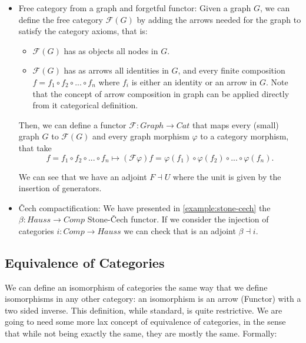 \begin{example}
  \begin{itemize}
  \item Free category from a graph and forgetful functor:  Given a graph $G$, we can define the free category $\mathcal{F}(G)$ by adding the arrows needed for the graph to satisfy the category axioms, that is:
    \begin{itemize}
    \item $\mathcal{F}(G)$ has as objects all nodes in $G$.
    \item $\mathcal{F}(G)$ has as arrows all identities in $G$, and every finite composition $f=f_1\circ f_2\circ ... \circ f_n$ where $f_i$ is either an identity or an arrow in $G$. Note that the concept of arrow composition in graph can be applied directly from it categorical definition.
    \end{itemize}
    
    Then, we can define a functor $\mathcal{F}:Graph \to Cat$ that maps every (small) graph $G$ to $\mathcal{F}(G)$ and every graph morphism $\varphi$ to a category morphism, that take
    $$f=f_1\circ f_2\circ ... \circ f_n \mapsto (\mathcal{F}\varphi) f = \varphi (f_1)\circ \varphi (f_2)\circ ... \circ \varphi (f_n).$$

    We can see that we have an adjoint $F \dashv U$ where the unit is given by the insertion of generators.
  \item \v{C}ech compactification\cite{wiki:stonecech}: We have presented in \ref{example:stone-cech} the $\beta: Hauss \to Comp$ Stone-\v{C}ech functor. If we consider the injection of categories $i: Comp \to Hauss$ we can check that is an adjoint $\beta \dashv i$.
  \end{itemize}
\end{example}




\subsection{Equivalence of Categories}
We can define an isomorphism of categories the same way that we define isomorphisms in any other category: an isomorphism is an arrow (Functor) with a two sided inverse. This definition, while standard, is quite restrictive. We are going to need some more lax concept of equivalence of categories, in the sense that while not being exactly the same, they are mostly the same. Formally:

